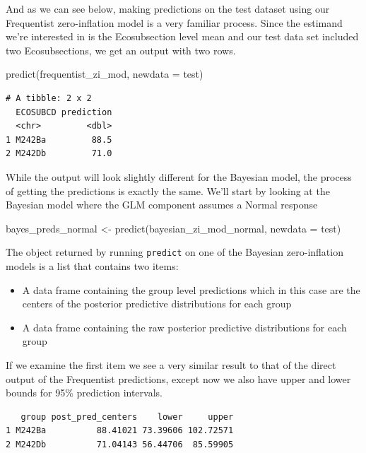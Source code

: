 \documentclass[12pt,twoside]{reedthesis}
\newenvironment{Shaded}{\begin{snugshade}}{\end{snugshade}}
\newcommand{\AttributeTok}[1]{\textcolor[rgb]{0.77,0.63,0.00}{#1}}
\newcommand{\FunctionTok}[1]{\textcolor[rgb]{0.00,0.00,0.00}{#1}}
\newcommand{\NormalTok}[1]{#1}
\newcommand{\OtherTok}[1]{\textcolor[rgb]{0.56,0.35,0.01}{#1}}
\newcommand{\SpecialCharTok}[1]{\textcolor[rgb]{0.00,0.00,0.00}{#1}}
\providecommand{\tightlist}{%
  \setlength{\itemsep}{0pt}\setlength{\parskip}{0pt}}
\begin{document}
And as we can see below, making predictions on the test dataset using our Frequentist zero-inflation model is a very familiar process. Since the estimand we're interested in is the Ecosubsection level mean and our test data set included two Ecosubsections, we get an output with two rows.
\begin{Shaded}
\begin{Highlighting}[]
\FunctionTok{predict}\NormalTok{(frequentist\_zi\_mod, }\AttributeTok{newdata =}\NormalTok{ test)}
\end{Highlighting}
\end{Shaded}
\begin{verbatim}
# A tibble: 2 x 2
  ECOSUBCD prediction
  <chr>         <dbl>
1 M242Ba         88.5
2 M242Db         71.0
\end{verbatim}
While the output will look slightly different for the Bayesian model, the process of getting the predictions is exactly the same. We'll start by looking at the Bayesian model where the GLM component assumes a Normal response
\begin{Shaded}
\begin{Highlighting}[]
\NormalTok{bayes\_preds\_normal }\OtherTok{\textless{}{-}} \FunctionTok{predict}\NormalTok{(bayesian\_zi\_mod\_normal, }\AttributeTok{newdata =}\NormalTok{ test)}
\end{Highlighting}
\end{Shaded}
The object returned by running \texttt{predict} on one of the Bayesian zero-inflation models is a list that contains two items:
\begin{itemize}
\tightlist
\item
  A data frame containing the group level predictions which in this case are the centers of the posterior predictive distributions for each group
\item
  A data frame containing the raw posterior predictive distributions for each group
\end{itemize}
If we examine the first item we see a very similar result to that of the direct output of the Frequentist predictions, except now we also have upper and lower bounds for 95\% prediction intervals.
\begin{Shaded}
\end{Shaded}
\begin{verbatim}
   group post_pred_centers    lower     upper
1 M242Ba          88.41021 73.39606 102.72571
2 M242Db          71.04143 56.44706  85.59905
\end{verbatim}
\end{document}

